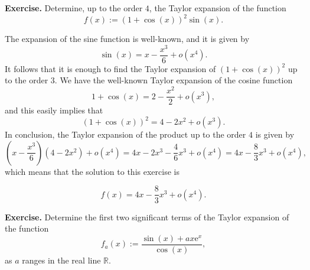 \documentclass[a4paper,10 pt]{report}
\newcommand{\finalanswer}[1]{%
    \begin{finalAnswer}
    \[
        #1
    \]
    \end{finalAnswer}
}
\theoremstyle{definition}
\newcommand{\R}{\mathbb R}
\begin{document}
\begin{exerciseBox} \textbf{Exercise.} Determine, up to the order $4$, the Taylor expansion of the function
\begin{equation*}f(x) := (1 + \cos(x))^2 \sin(x).\end{equation*}
\end{exerciseBox}

\begin{solutionBox} The expansion of the sine function is well-known, and it is given by
\begin{equation*} \sin(x) = x - \frac{x^3}{6} + o(x^4). \end{equation*}
It follows that it is enough to find the Taylor expansion of $(1 + \cos(x))^2$ up to the order $3$. We have the well-known Taylor expansion of the cosine function
\begin{equation*} 1 + \cos(x) = 2 - \frac{x^2}{2} + o(x^3), \end{equation*}
and this easily implies that
\begin{equation*} (1 + \cos(x))^2 = 4 - 2 x^2 + o(x^3).\end{equation*}
In conclusion, the Taylor expansion of the product up to the order $4$ is given by
\begin{equation*} \left(x - \frac{x^3}{6}\right) \left(4 - 2x^2 \right) + o(x^4) = 4x - 2x^3 - \frac{4}{6}x^3 + o(x^4) = 4x - \frac{8}{3}x^3 + o(x^4), \end{equation*}
which means that the solution to this exercise is
\finalanswer{
f(x) = 4x - \frac{8}{3}x^3 + o(x^4).
} 
\end{solutionBox}

\begin{exerciseBox} \textbf{Exercise.} Determine the first two significant terms of the Taylor expansion of the function
\begin{equation*}f_a(x) := \frac{\sin(x) + a x \mathrm{e}^x}{\cos(x)},\end{equation*}
as $a$ ranges in the real line $\R$.
\end{exerciseBox}
\end{document}
